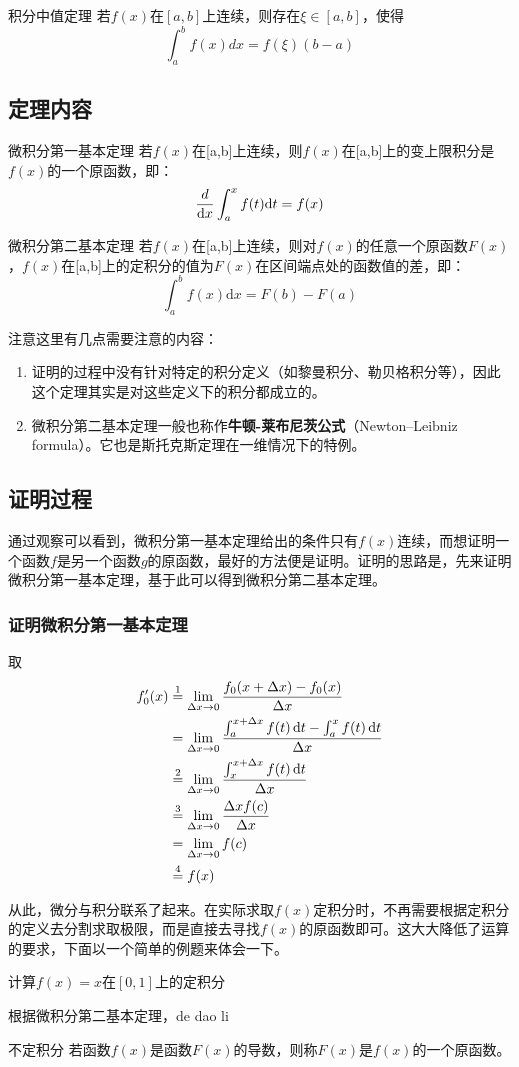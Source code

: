 \begin{lemma}{积分中值定理}
若$f(x)$在$[a,b]$上连续，则存在$\xi\in[a,b]$，使得
$$\int_{a}^{b} f(x)dx=f(\xi)(b-a)$$
\end{lemma}
\subsection{定理内容}

\begin{theorem}{微积分第一基本定理}
若$f(x)$在[a,b]上连续，则$f(x)$在[a,b]上的变上限积分是$f(x)$的一个原函数，即：
$${d\over\mathrm {d}x}\int_{a}^{x}f(t)\mathrm {d}t=f(x)$$
\end{theorem}

\begin{theorem}{微积分第二基本定理}
若$f(x)$在[a,b]上连续，则对$f(x)$的任意一个原函数$F(x)$，$f(x)$在[a,b]上的定积分的值为$F(x)$在区间端点处的函数值的差，即：
$$\int_{a}^{b} f(x)\mathrm {d}x=F(b)-F(a)$$
\end{theorem}

注意这里有几点需要注意的内容：
\begin{enumerate}
\item 证明的过程中没有针对特定的积分定义（如黎曼积分、勒贝格积分等），因此这个定理其实是对这些定义下的积分都成立的。
\item 微积分第二基本定理一般也称作\textbf{牛顿-莱布尼茨公式}（Newton–Leibniz formula）。它也是斯托克斯定理在一维情况下的特例。
\end{enumerate}

\subsection{证明过程}

通过观察可以看到，微积分第一基本定理给出的条件只有$f(x)$连续，而想证明一个函数$f$是另一个函数$g$的原函数，最好的方法便是证明。证明的思路是，先来证明微积分第一基本定理，基于此可以得到微积分第二基本定理。

\subsubsection{证明微积分第一基本定理}

取
$$\begin{align*}f_0'(x) &\overset{\mathrm{1}}{=} \lim_{\Delta x\to0}{f_0(x+\Delta x)-f_0(x)\over\Delta x} \\ 
&= \lim_{\Delta x\to0}{\int_{a}^{x+\Delta x} f(t)\, \mathrm {d}t-\int_{a}^{x} f(t)\, \mathrm {d}t\over\Delta x}\\ 
&\overset{\mathrm{2}}{=}\lim_{\Delta x\to0}{\int_{x}^{x+\Delta x} f(t)\, \mathrm {d}t\over\Delta x}\\
&\overset{\mathrm{3}}{=}\lim_{\Delta x\to0}{\Delta xf(c)\over\Delta x} \\ 
&=\lim_{\Delta x\to0}f(c)\\ 
&\overset{\mathrm{4}}{=}f(x)\end{align*}$$

从此，微分与积分联系了起来。在实际求取$f(x)$定积分时，不再需要根据定积分的定义去分割求取极限，而是直接去寻找$f(x)$的原函数即可。这大大降低了运算的要求，下面以一个简单的例题来体会一下。
\begin{example}{}
计算$f(x)=x$在$[0,1]$上的定积分
\end{example}

根据微积分第二基本定理，de dao li
\begin{definition}{不定积分}
若函数$f(x)$是函数$F(x)$的导数，则称$F(x)$是$f(x)$的一个原函数。
\end{definition}
